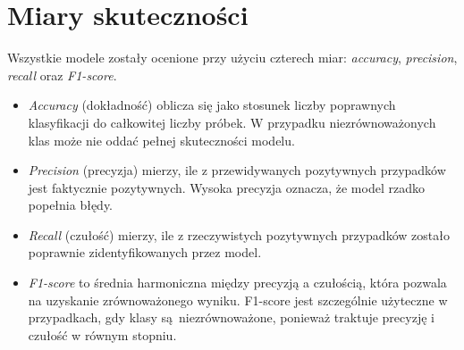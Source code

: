 \section{Miary skuteczności}
Wszystkie modele zostały ocenione przy użyciu czterech miar: \textit{accuracy}, \textit{precision}, \textit{recall} oraz \textit{F1-score}. 
\begin{itemize}
    \item \textit{Accuracy} (dokładność) oblicza się jako stosunek liczby poprawnych klasyfikacji do całkowitej liczby próbek. W przypadku niezrównoważonych klas może nie oddać pełnej skuteczności modelu.
    \item \textit{Precision} (precyzja) mierzy, ile z przewidywanych pozytywnych przypadków jest faktycznie pozytywnych. Wysoka precyzja oznacza, że model rzadko popełnia błędy.
    \item \textit{Recall} (czułość) mierzy, ile z rzeczywistych pozytywnych przypadków zostało poprawnie zidentyfikowanych przez model.
    \item \textit{F1-score} to średnia harmoniczna między precyzją a czułością, która pozwala na uzyskanie zrównoważonego wyniku. F1-score jest szczególnie użyteczne w przypadkach, gdy klasy są~niezrównoważone, ponieważ traktuje precyzję i czułość w równym stopniu.
\end{itemize}

\endinput